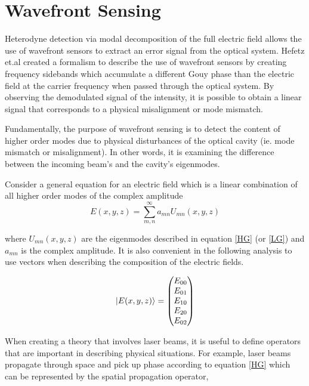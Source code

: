 		
		\section{Wavefront Sensing}\label{WFS}
		Heterodyne detection via modal decomposition of the full electric field allows the use of wavefront sensors to extract an error signal from the optical system.  Hefetz et.al \cite{HefetzWFS} created a formalism to describe the use of wavefront sensors by creating frequency sidebands which accumulate a different Gouy phase than the electric field at the carrier frequency when passed through the optical system.  By observing the demodulated signal of the intensity, it is possible to obtain a linear signal that corresponds to a physical misalignment or mode mismatch.
		
		Fundamentally, the purpose of wavefront sensing is to detect the content of higher order modes due to physical disturbances of the optical cavity (ie. mode mismatch or misalignment).  In other words, it is examining the difference between the incoming beam's and the cavity's eigenmodes.
		
		Consider a general equation for an electric field which is a linear combination of all higher order modes of the complex amplitude
		\begin{equation}
		E(x,y,z) = \sum\limits_{m,n}^{\infty} a_{mn} U_{mn}(x,y,z)
		\end{equation}
		
		where $ U_{mn}(x,y,z)$ are the eigenmodes described in equation \ref{HG} (or \ref{LG}) and $a_{mn}$ is the complex amplitude.  It is also convenient in the following analysis to use vectors when describing the composition of the electric fields.
		
		\begin{equation}\label{EVector}
		\ket{E(x,y,z)} = \begin{pmatrix} E_{00} 
		\\ E_{01}
		\\E_{10}
		\\E_{20}
		\\E_{02}
		\end{pmatrix}
		\end{equation}

		When creating a theory that involves laser beams, it is useful to define operators that are important in describing physical situations.  For example, laser beams propagate through space and pick up phase according to equation \ref{HG} which can be represented by the spatial propagation operator,
		
